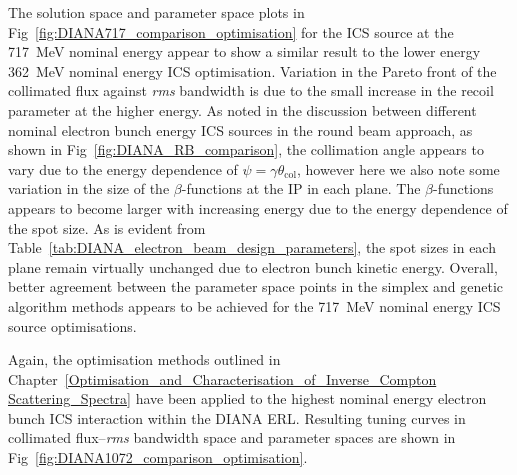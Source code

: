 \documentclass[../main.tex]{subfiles}
\begin{document}
The solution space and parameter space plots in Fig~\ref{fig:DIANA717_comparison_optimisation} for the ICS source at the 717~\si{\mega\electronvolt} nominal energy appear to show a similar result to the lower energy 362~\si{\mega\electronvolt} nominal energy ICS optimisation. Variation in the Pareto front of the collimated flux against \textit{rms} bandwidth is due to the small increase in the recoil parameter at the higher energy. As noted in the discussion between different nominal electron bunch energy ICS sources in the round beam approach, as shown in Fig~\ref{fig:DIANA_RB_comparison}, the collimation angle appears to vary due to the energy dependence of $\psi = \gamma\theta_{\mathrm{col}}$, however here we also note some variation in the size of the $\beta$-functions at the IP in each plane. The $\beta$-functions appears to become larger with increasing energy due to the energy dependence of the spot size. As is evident from Table~\ref{tab:DIANA_electron_beam_design_parameters}, the spot sizes in each plane remain virtually unchanged due to electron bunch kinetic energy. Overall, better agreement between the parameter space points in the simplex and genetic algorithm methods appears to be achieved for the 717~\si{\mega\electronvolt} nominal energy ICS source optimisations.

Again, the optimisation methods outlined in Chapter~\ref{Optimisation_and_Characterisation_of_Inverse_Compton Scattering_Spectra} have been applied to the highest nominal energy electron bunch ICS interaction within the DIANA ERL. Resulting tuning curves in collimated flux--\textit{rms} bandwidth space and parameter spaces are shown in Fig~\ref{fig:DIANA1072_comparison_optimisation}.
\end{document}
